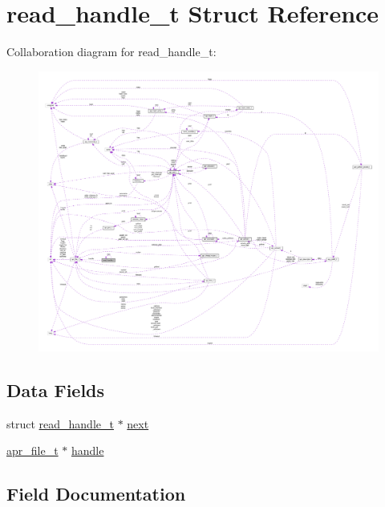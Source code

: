 \hypertarget{structread__handle__t}{}\section{read\+\_\+handle\+\_\+t Struct Reference}
\label{structread__handle__t}


Collaboration diagram for read\+\_\+handle\+\_\+t\+:
\nopagebreak
\begin{figure}[H]
\begin{center}
\leavevmode
\includegraphics[width=350pt]{structread__handle__t__coll__graph}
\end{center}
\end{figure}
\subsection*{Data Fields}
\begin{DoxyCompactItemize}
\item 
struct \hyperlink{structread__handle__t}{read\+\_\+handle\+\_\+t} $\ast$ \hyperlink{structread__handle__t_ac0fe4fcdf848e8fd3ea10b1d567f8620}{next}
\item 
\hyperlink{structapr__file__t}{apr\+\_\+file\+\_\+t} $\ast$ \hyperlink{structread__handle__t_a928abea4d2047efde124ccfb48ce6e26}{handle}
\end{DoxyCompactItemize}


\subsection{Field Documentation}
